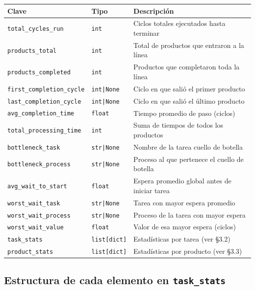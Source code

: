 \documentclass[12pt,letterpaper]{article}
\begin{document}
\begin{center}
\begin{tabularx}{\textwidth}{|l|l|X|}
\hline
\textbf{Clave} & \textbf{Tipo} & \textbf{Descripción} \\
\hline
\texttt{total\_cycles\_run} & \texttt{int} & Ciclos totales ejecutados hasta terminar \\
\hline
\texttt{products\_total} & \texttt{int} & Total de productos que entraron a la línea \\
\hline
\texttt{products\_completed} & \texttt{int} & Productos que completaron toda la línea \\
\hline
\texttt{first\_completion\_cycle} & \texttt{int|None} & Ciclo en que salió el primer producto \\
\hline
\texttt{last\_completion\_cycle} & \texttt{int|None} & Ciclo en que salió el último producto \\
\hline
\texttt{avg\_completion\_time} & \texttt{float} & Tiempo promedio de paso (ciclos) \\
\hline
\texttt{total\_processing\_time} & \texttt{int} & Suma de tiempos de todos los productos \\
\hline
\texttt{bottleneck\_task} & \texttt{str|None} & Nombre de la tarea cuello de botella \\
\hline
\texttt{bottleneck\_process} & \texttt{str|None} & Proceso al que pertenece el cuello de botella \\
\hline
\texttt{avg\_wait\_to\_start} & \texttt{float} & Espera promedio global antes de iniciar tarea \\
\hline
\texttt{worst\_wait\_task} & \texttt{str|None} & Tarea con mayor espera promedio \\
\hline
\texttt{worst\_wait\_process} & \texttt{str|None} & Proceso de la tarea con mayor espera \\
\hline
\texttt{worst\_wait\_value} & \texttt{float} & Valor de esa mayor espera (ciclos) \\
\hline
\texttt{task\_stats} & \texttt{list[dict]} & Estadísticas por tarea (ver \S3.2) \\
\hline
\texttt{product\_stats} & \texttt{list[dict]} & Estadísticas por producto (ver \S3.3) \\
\hline
\end{tabularx}
\end{center}

\subsection{Estructura de cada elemento en \texttt{task\_stats}}
\end{document}
